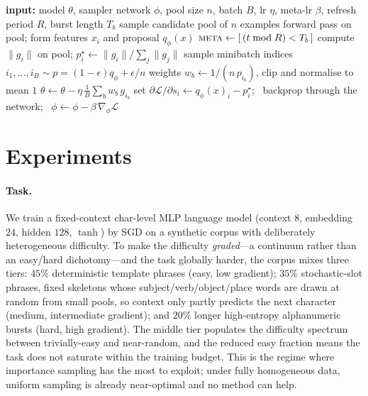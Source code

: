 \documentclass[11pt]{article}
\begin{document}
\begin{algorithm}[t]
\caption{Training with a learned, periodically-refreshed sampler network}
\label{alg:main}
\begin{algorithmic}[1]
\State \textbf{input:} model $\theta$, sampler network $\phi$, pool size $n$,
batch $B$, lr $\eta$, meta-lr $\beta$, refresh period $R$, burst length $T_b$
  \State sample candidate pool of $n$ examples
  \State forward pass on pool; form features $x_i$ and proposal $q_\phi(x)$
  \State $\textsc{meta} \gets [\,(t \bmod R) < T_b\,]$ \hfill{}
   compute $\|g_i\|$ on pool; \quad $p^\star_i \gets \|g_i\|/\sum_j\|g_j\|$ \EndIf
  \State sample minibatch indices $i_1,\dots,i_B \sim p=(1-\epsilon)q_\phi+\epsilon/n$
  \State weights $w_b \gets 1/(n\,p_{i_b})$, clip and normalise to mean $1$
  \State $\theta \gets \theta - \eta\, \tfrac1B\sum_b w_b\, g_{i_b}$
  \hfill{}
   set $\partial\mathcal L/\partial s_i \gets q_\phi(x)_i - p^\star_i$;
  \ backprop through the network; \ $\phi \gets \phi - \beta\,\nabla_\phi\mathcal L$
  \hfill{}\EndIf
\EndFor
\end{algorithmic}
\end{algorithm}

\section{Experiments}

\paragraph{Task.} We train a fixed-context char-level MLP language model
(context $8$, embedding $24$, hidden $128$, $\tanh$) by SGD on a synthetic corpus
with deliberately heterogeneous difficulty. To make the difficulty
\emph{graded}---a continuum rather than an easy/hard dichotomy---and the task
globally harder, the corpus mixes three tiers: $45\%$ deterministic template
phrases (easy, low gradient); $35\%$ stochastic-slot phrases, fixed skeletons
whose subject/verb/object/place words are drawn at random from small pools, so
context only partly predicts the next character (medium, intermediate gradient);
and $20\%$ longer high-entropy alphanumeric bursts (hard, high gradient). The
middle tier populates the difficulty spectrum between trivially-easy and
near-random, and the reduced easy fraction means the task does not saturate
within the training budget. This is the regime where importance sampling has the
most to exploit; under fully homogeneous data, uniform sampling is already
near-optimal and no method can help.
\end{document}
